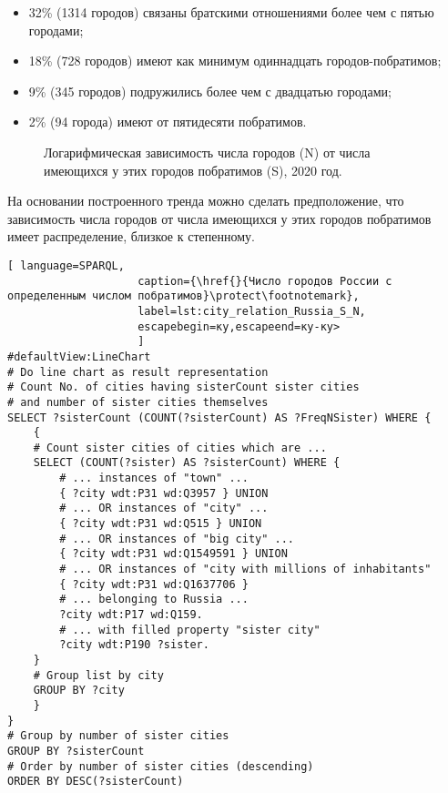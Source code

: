 \begin{itemize}
\item 32\% (\num{1314} городов) связаны братскими отношениями более чем с пятью городами;
\item 18\% (728 городов) имеют как минимум одиннадцать городов-побратимов;
\item 9\% (345 городов) подружились более чем с двадцатью городами;
\item 2\% (94 города) имеют от пятидесяти побратимов.
\end{itemize}

\begin{figure*}[h]
{
\setlength{\fboxsep}{0pt}%
\setlength{\fboxrule}{1pt}%
%
}
  \caption{Логарифмическая зависимость числа городов (N) от числа имеющихся у этих городов побратимов (S), 2020 год.}%
  \label{fig:city_ln_relation_S_N}%
\end{figure*}

На основании построенного тренда можно сделать предположение, что зависимость числа городов от числа имеющихся у этих городов побратимов имеет распределение, близкое к степенному.

\begin{lstlisting}[ language=SPARQL, 
                    caption={\href{}{Число городов России с определенным числом побратимов}\protect\footnotemark},
                    label=lst:city_relation_Russia_S_N, 
                    escapebegin=ку,escapeend=ку-ку>
                    ]
#defaultView:LineChart                                                   
# Do line chart as result representation
# Count No. of cities having sisterCount sister cities  
# and number of sister cities themselves
SELECT ?sisterCount (COUNT(?sisterCount) AS ?FreqNSister) WHERE {                                                                                  
	{
	# Count sister cities of cities which are ...
	SELECT (COUNT(?sister) AS ?sisterCount) WHERE {    
		# ... instances of "town" ...                 
		{ ?city wdt:P31 wd:Q3957 } UNION    
		# ... OR instances of "city" ...                              
		{ ?city wdt:P31 wd:Q515 } UNION     
		# ... OR instances of "big city" ...                              
		{ ?city wdt:P31 wd:Q1549591 } UNION     
		# ... OR instances of "city with millions of inhabitants"                          
		{ ?city wdt:P31 wd:Q1637706 }                 
		# ... belonging to Russia ...                    
		?city wdt:P17 wd:Q159. 
		# ... with filled property "sister city"                                           
		?city wdt:P190 ?sister.                                           
	}
	# Group list by city
	GROUP BY ?city                                                      
	}
}
# Group by number of sister cities
GROUP BY ?sisterCount       
# Order by number of sister cities (descending)                                             
ORDER BY DESC(?sisterCount)                                             
\end{lstlisting}

